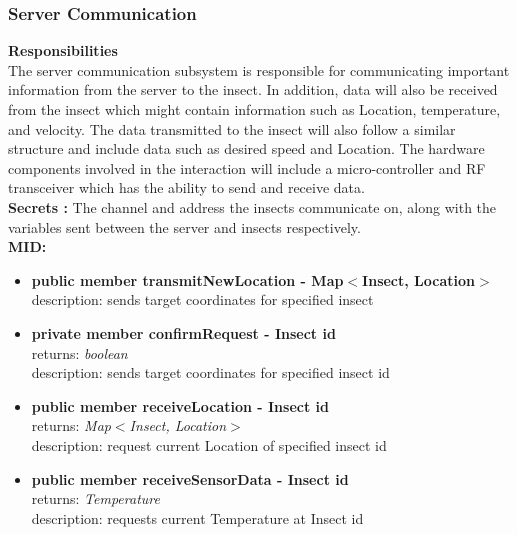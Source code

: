 \documentclass[11pt]{article}
\begin{document}
\subsubsection{Server Communication}
\textbf{Responsibilities} \\
The server communication subsystem is responsible for communicating important information from the server to the insect. In addition, data will also be received from the insect which might contain information such as Location, temperature, and velocity. The data transmitted to the insect will
also follow a similar structure and include data such as desired speed and Location. The hardware components involved in the interaction will include a micro-controller and RF transceiver which has the ability to send and receive data. \\
\newline
\textbf{Secrets : } The channel and address the insects communicate on, along with the variables sent between the server and insects respectively. \\
\newline
\textbf{MID:}
\begin{itemize}
    \item \textbf{public member transmitNewLocation - Map$<$Insect, Location$>$} \\ description: sends target coordinates for specified insect
    \item \textbf{private member confirmRequest - Insect id}
    \\returns: \textit{boolean}
    \\description: sends target coordinates for specified insect id
    \item \textbf{public member receiveLocation - Insect id}
    \\ returns: \textit{Map$<$Insect, Location$>$} \\ description: request current Location of specified insect id 
    \item \textbf{public member receiveSensorData - Insect id} \\
    returns: \textit{Temperature} \\ 
    description: requests current Temperature at Insect id 
    
\end{itemize}
\end{document}
